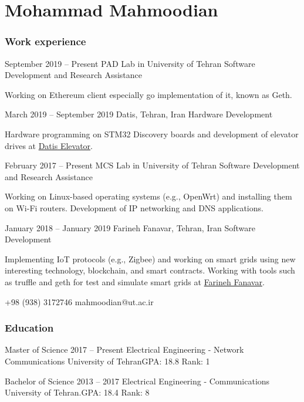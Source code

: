 \documentclass{tccv}
\begin{document}
\part{Mohammad Mahmoodian}

\section{Work experience}

\begin{eventlist}

\item{September 2019 -- Present}
     {PAD Lab in University of Tehran}
     {Software Development and Research Assistance}

Working on Ethereum client especially go implementation of it, known as Geth.

\item{March 2019 -- September 2019}
     {Datis, Tehran, Iran}
     {Hardware Development}

Hardware programming on STM32 Discovery boards and development of elevator
drives at \href{www.datis-elevator.ir}{Datis Elevator}.


\item{February 2017 -- Present}
     {MCS Lab in University of Tehran}
     {Software Development and Research Assistance}

Working on Linux-based operating systems (e.g., OpenWrt) and installing them on Wi-Fi routers.
Development of IP networking and DNS applications.

\item{January 2018 -- January 2019}
     {Farineh Fanavar, Tehran, Iran}
     {Software Development}

Implementing IoT protocols (e.g., Zigbee) and working on smart grids using
new interesting technology, blockchain, and smart contracts. Working with tools
such as truffle and geth for test and simulate smart grids
at \href{http://farinehtech.com/}{Farineh Fanavar}.

\end{eventlist}

    {+98 (938) 3172746}
    {mahmoodian@ut.ac.ir}

\section{Education}

\begin{yearlist}
\item[Master of Science]{2017 -- Present}
     {Electrical Engineering - Network Communications}
     {University of Tehran\newline GPA: 18.8 \newline Rank: 1}

\item[Bachelor of Science]{2013 -- 2017}
     {Electrical Engineering - Communications}
     {University of Tehran.\newline GPA: 18.4 \newline Rank: 8}
\end{yearlist}
\end{document}
